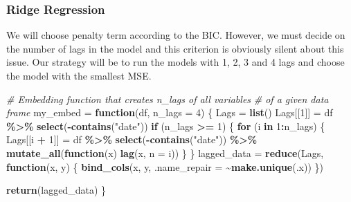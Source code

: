 \documentclass[
]{article}
\newenvironment{Shaded}{\begin{snugshade}}{\end{snugshade}}
\newcommand{\AttributeTok}[1]{\textcolor[rgb]{0.13,0.29,0.53}{#1}}
\newcommand{\CommentTok}[1]{\textcolor[rgb]{0.56,0.35,0.01}{\textit{#1}}}
\newcommand{\ControlFlowTok}[1]{\textcolor[rgb]{0.13,0.29,0.53}{\textbf{#1}}}
\newcommand{\DecValTok}[1]{\textcolor[rgb]{0.00,0.00,0.81}{#1}}
\newcommand{\FunctionTok}[1]{\textcolor[rgb]{0.13,0.29,0.53}{\textbf{#1}}}
\newcommand{\NormalTok}[1]{#1}
\newcommand{\OtherTok}[1]{\textcolor[rgb]{0.56,0.35,0.01}{#1}}
\newcommand{\SpecialCharTok}[1]{\textcolor[rgb]{0.81,0.36,0.00}{\textbf{#1}}}
\newcommand{\StringTok}[1]{\textcolor[rgb]{0.31,0.60,0.02}{#1}}
\begin{document}
\hypertarget{ridge-regression}{%
\subsubsection{Ridge Regression}\label{ridge-regression}}

We will choose penalty term according to the BIC. However, we must
decide on the number of lags in the model and this criterion is
obviously silent about this issue. Our strategy will be to run the
models with 1, 2, 3 and 4 lags and choose the model with the smallest
MSE.

\begin{Shaded}
\begin{Highlighting}[]
\CommentTok{\# Embedding function that creates n\_lags of all variables}
\CommentTok{\# of a given data frame}
\NormalTok{my\_embed }\OtherTok{=} \ControlFlowTok{function}\NormalTok{(df, }\AttributeTok{n\_lags =} \DecValTok{4}\NormalTok{) \{}
\NormalTok{    Lags }\OtherTok{=} \FunctionTok{list}\NormalTok{()}
\NormalTok{    Lags[[}\DecValTok{1}\NormalTok{]] }\OtherTok{=}\NormalTok{ df }\SpecialCharTok{\%\textgreater{}\%}
        \FunctionTok{select}\NormalTok{(}\SpecialCharTok{{-}}\FunctionTok{contains}\NormalTok{(}\StringTok{"date"}\NormalTok{))}
    \ControlFlowTok{if}\NormalTok{ (n\_lags }\SpecialCharTok{\textgreater{}=} \DecValTok{1}\NormalTok{) \{}
        \ControlFlowTok{for}\NormalTok{ (i }\ControlFlowTok{in} \DecValTok{1}\SpecialCharTok{:}\NormalTok{n\_lags) \{}
\NormalTok{            Lags[[i }\SpecialCharTok{+} \DecValTok{1}\NormalTok{]] }\OtherTok{=}\NormalTok{ df }\SpecialCharTok{\%\textgreater{}\%}
                \FunctionTok{select}\NormalTok{(}\SpecialCharTok{{-}}\FunctionTok{contains}\NormalTok{(}\StringTok{"date"}\NormalTok{)) }\SpecialCharTok{\%\textgreater{}\%}
                \FunctionTok{mutate\_all}\NormalTok{(}\ControlFlowTok{function}\NormalTok{(x) }\FunctionTok{lag}\NormalTok{(x, }\AttributeTok{n =}\NormalTok{ i))}
\NormalTok{        \}}
\NormalTok{    \}}
\NormalTok{    lagged\_data }\OtherTok{=} \FunctionTok{reduce}\NormalTok{(Lags, }\ControlFlowTok{function}\NormalTok{(x, y) \{}
        \FunctionTok{bind\_cols}\NormalTok{(x, y, }\AttributeTok{.name\_repair =} \SpecialCharTok{\textasciitilde{}}\FunctionTok{make.unique}\NormalTok{(.x))}
\NormalTok{    \})}

    \FunctionTok{return}\NormalTok{(lagged\_data)}
\NormalTok{\}}
\end{Highlighting}
\end{Shaded}
\end{document}
